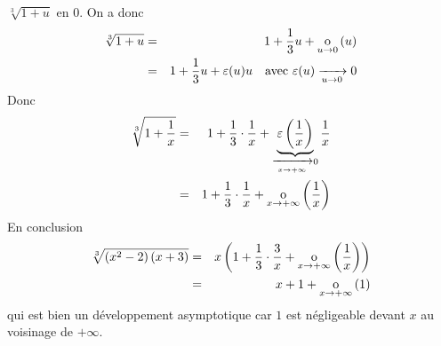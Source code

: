 \documentclass{magnoliaold}
\begin{document}
\begin{exos}
\begin{sol}
  $\sqrt[3]{1+u}$ en 0. On a donc
  \begin{eqnarray*}
  \sqrt[3]{1+u}
  &=& 1+\frac{1}{3}u+\underset{u \rightarrow 0}{\text{o}}\left(u\right)\\
  &=& 1+\frac{1}{3}u+\varepsilon(u)u
      \quad \text{avec $\varepsilon(u)\xrightarrow[u\rightarrow 0]{}0$}\\
  \end{eqnarray*}
  Donc
  \begin{eqnarray*}
  \sqrt[3]{1+\frac{1}{x}}
  &=& 1+\frac{1}{3}\cdot\frac{1}{x}+
      \underbrace{\varepsilon\left(\frac{1}{x}\right)}_{\xrightarrow[x\rightarrow +\infty]{}0}
      \frac{1}{x}\\
  &=& 1+\frac{1}{3}\cdot\frac{1}{x}+\underset{x \rightarrow +\infty}{\text{o}}\left(\frac{1}{x}\right)
  \end{eqnarray*}
  En conclusion
  \begin{eqnarray*}
  \sqrt[3]{\left(x^2-2\right)\left(x+3\right)}
  &=& x\left(1+\frac{1}{3}\cdot\frac{3}{x}+\underset{x \rightarrow +\infty}{\text{o}}\left(\frac{1}{x}\right)\right)\\
  &=& x+1+\underset{x \rightarrow +\infty}{\text{o}}\left(1\right)
  \end{eqnarray*}
  qui est bien un développement asymptotique car $1$ est négligeable devant
  $x$ au voisinage de $+\infty$.   
  

\end{sol}
\end{exos}
\end{document}
